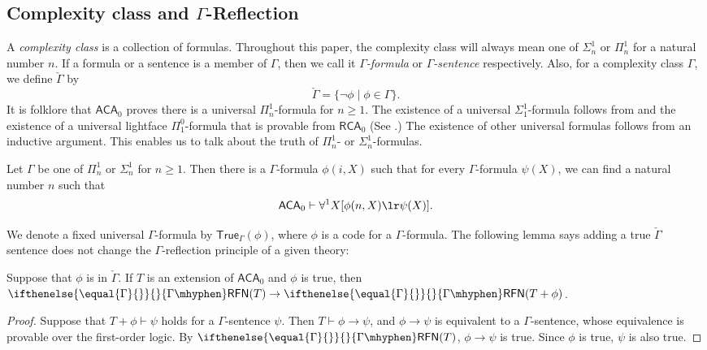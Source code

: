 \documentclass{mhkr}
\newcommand{\added}[1]{#1}
\newcommand{\True}{\mathsf{True}}
\newcommand{\RFN}[1][]{\ifthenelse{\equal{#1}{}}{}{#1\mhyphen}\mathsf{RFN}}
\newcommand{\RCA}{\mathsf{RCA}}
\newcommand{\ACA}{\mathsf{ACA}}
\begin{document}
\subsection{Complexity class and $\Gamma$-Reflection}
A \emph{complexity class} \added{is} a collection of formulas. Throughout this paper, the complexity class will always mean one of $\Sigma^1_n$ or $\Pi^1_n$ for a natural number $n$. If a formula or a sentence is a member of $\Gamma$, then we call it \emph{$\Gamma$-formula} or \emph{$\Gamma$-sentence} respectively. Also, for a complexity class $\Gamma$, we define $\check{\Gamma}$ by
\begin{equation*}
    \check{\Gamma} = \{\lnot\phi \mid \phi \in \Gamma\}.
\end{equation*}
It is \added{folklore} that $\ACA_0$ proves there is a universal $\Pi^1_n$-formula for $n\ge 1$. \added{The existence of a universal $\Sigma^1_1$-formula follows from \cite[Lemma V.1.4]{Simpson2009} and the existence of a universal lightface $\Pi^0_1$-formula that is provable from $\RCA_0$ (See \cite[Definition VII.1.3]{Simpson2009}.) The existence of other universal formulas follows from an inductive argument.} This enables us to talk about the truth of $\Pi^1_n$- or $\Sigma^1_n$-formulas.
\begin{proposition} \pushQED{\qed}
    Let $\Gamma$ be one of $\Pi^1_n$ or $\Sigma^1_n$ for $n\ge 1$. Then there is a $\Gamma$-formula $\phi(i,X)$ such that for every $\Gamma$-formula $\psi(X)$, we can find a natural number $n$ such that
    \begin{equation*}
        \added{\ACA_0 \vdash  \forall^1 X [\phi(n,X)\lr \psi(X)].}
        \qedhere 
    \end{equation*}
\end{proposition}
We denote a fixed universal $\Gamma$-formula by $\True_\Gamma(\phi)$, where $\phi$ is a code for a $\Gamma$-formula.
The following lemma says adding a true $\check{\Gamma}$ sentence does not change the $\Gamma$-reflection principle of a given theory:
\begin{lemma}[$\ACA_0$] \label{Lemma: RFN is stable under adding true check Gamma statements}
    Suppose that $\phi$ is in $\check{\Gamma}$. If \added{$T$ is an extension of $\ACA_0$ and} $\phi$ is true, then $\RFN[\Gamma](T)\to \RFN[\Gamma](T+\phi)$.
\end{lemma}
\begin{proof}
    Suppose that $T+\phi \vdash \psi$ holds for a $\Gamma$-sentence $\psi$. Then $T\vdash \phi\to\psi$, and $\phi\to\psi$ is equivalent to a $\Gamma$-sentence, whose equivalence is provable over the first-order logic. By $\RFN[\Gamma](T)$, $\phi\to\psi$ is true. Since $\phi$ is true, $\psi$ is also true. 
\end{proof}
\end{document}
